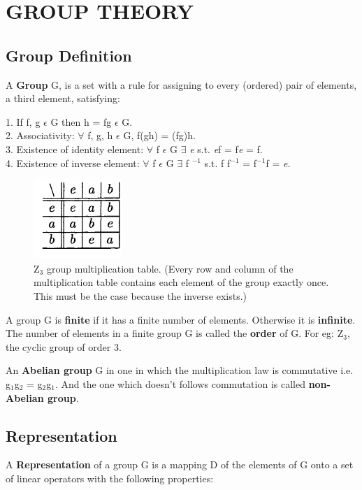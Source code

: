 \section{GROUP THEORY}
\subsection{Group Definition}
A \textbf{Group} G, is a set with a rule for assigning to every (ordered) pair of
elements, a third element, satisfying:

1. If f, g $\epsilon$ G then h = fg $\epsilon$ G. \\
2. Associativity: $\forall$ f, g, h $\epsilon$ G, f(gh) = (fg)h. \\
3. Existence of identity element: $\forall$ f $\epsilon$ G $\exists$ \textit{e} s.t. \textit{e}f = f\textit{e} = f. \\
4. Existence of inverse element: $\forall$ f $\epsilon$ G $\exists$ f $^{-1}$ s.t. f f$^{-1}$ = f$^{-1}$f = \textit{e}.
\begin{figure}[h]
    \centering
    \includegraphics[width=0.3\textwidth]{figures/z3-group.png}
    \caption{Z$_3$ group multiplication table. (Every row and column
    of the multiplication table contains each element of the group exactly once.
    This must be the case because the inverse exists.)}
\end{figure}

A group G is \textbf{finite} if it has a finite number of elements. Otherwise it is \textbf{infinite}.
The number of elements in a finite group G is called the \textbf{order} of G. For eg: Z$_3$, the cyclic group of order 3.

An \textbf{Abelian group} G in one in which the multiplication law is commutative i.e.
g$_1$g$_2$ = g$_2$g$_1$. And the one which doesn't follows commutation is called \textbf{non-Abelian group}.

\subsection{Representation}
A \textbf{Representation} of a group G is a mapping D of the elements of G onto a set of
linear operators with the following properties:

